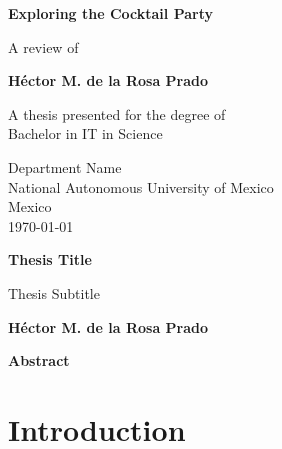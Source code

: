 \documentclass{book}
\begin{document}
\begin{titlepage}
    \begin{center}
        \vspace*{1cm}
 
        \Huge
        \textbf{Exploring the Cocktail Party}
 
        \vspace{0.5cm}
        \LARGE
        A review of 
 
        \vspace{1.5cm}
 
        \textbf{Héctor M. de la Rosa Prado}
 
        \vfill
 
        A thesis presented for the degree of\\
        Bachelor in IT in Science
 
        \vspace{0.8cm}
 
 
        \Large
        Department Name\\
        National Autonomous University of Mexico\\
        Mexico\\
        \today
 
    \end{center}
\end{titlepage}

\tableofcontents
\newpage

\thispagestyle{plain}
\begin{center}
    \Large
    \textbf{Thesis Title}
 
    \vspace{0.4cm}
    \large
    Thesis Subtitle
 
    \vspace{0.4cm}
    \textbf{Héctor M. de la Rosa Prado}
 
    \vspace{0.9cm}
    \textbf{Abstract}
\end{center}

\chapter{Introduction}
\end{document}
